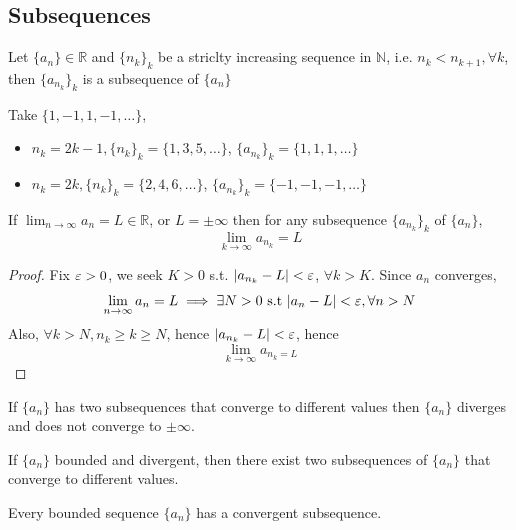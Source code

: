 \subsection{Subsequences}

\begin{definition}[Subsequence]
    Let $\{ a_n \}  \in \mathbb{R}$ and $\{ n_k \}_k$ be a 
    striclty increasing sequence 
    in $\mathbb{N}$, i.e. $n_k < n_{k + 1}, \forall k$, then 
    $\{ a_{n_k} \}_k$ is a subsequence of $\{ a_n \} $
\end{definition}

\begin{example}
    Take $\{ 1, -1, 1, -1, \hdots \} $, 
    \begin{itemize}
        \item $n_k = 2k - 1, \{ n_k \}_k = \{ 1, 3, 5, \hdots \}$, 
        $\{ a_{n_k} \}_k = \{ 1, 1, 1, \hdots \}  $
        \item $n_k = 2k , \{ n_k \}_k = \{ 2, 4, 6, \hdots \}$, 
        $\{ a_{n_k} \}_k = \{ -1, -1, -1, \hdots \}  $
    \end{itemize} 
\end{example}

\begin{theorem}
    If $\lim_{n \to \infty}a_n = L \in \mathbb{R}$, or $L = \pm \infty$
    then for any subsequence $\{ a_{n_k} \}_k $ of $\{ a_n \} $, 
    \[
        \lim_{k \to \infty} a_{n_k} = L
    \]
\end{theorem}

\begin{proof}
    Fix $\varepsilon > 0$, we seek $K > 0$ s.t. $ \left| a_{n_k}  - L \right| < \varepsilon$,
    $\forall k > K$. 
    Since $a_n$ converges, 
    \[
        \lim_{n \to \infty} a_n = L \implies \exists N > 0 \text{ s.t }
        |a_n - L | < \varepsilon, \forall n > N
    \]
    Also, $\forall k > N, n_k \geq k \geq N$, hence $|a_{n_k} - L | < \varepsilon$, 
    hence 
    \[
        \lim_{k \to \infty} a_{n_k = L}
    \]
\end{proof}

\begin{corollary}
    If $\{ a_n \} $ has two subsequences that converge to different values
    then $\{ a_n \} $ diverges and does not converge to $\pm \infty$.
\end{corollary}

\begin{theorem}
    \label{theroem:bdd-dvgt-implies-multiple-cvgt-subseq}
    If $\{ a_n \} $ bounded and divergent, 
    then there exist two subsequences of $\{ a_n \} $ that converge 
    to different values. 
\end{theorem}

\begin{theorem}
    \label{theorem:bdd-implies-cvgt-subseq}
    Every bounded sequence $\{ a_n \} $ has a convergent subsequence.
\end{theorem}













